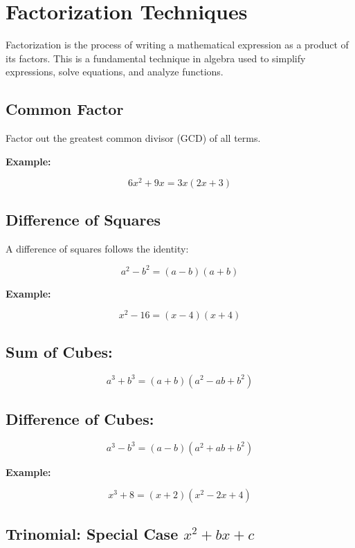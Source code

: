 \newpage
\section{Factorization Techniques}

Factorization is the process of writing a mathematical expression as a product 
of its factors. This is a fundamental technique in algebra used to simplify expressions, 
solve equations, and analyze functions.

\subsection{Common Factor}

Factor out the greatest common divisor (GCD) of all terms.
\vspace{\baselineskip}

\textbf{Example:}

\[
  6x^2 + 9x = 3x(2x + 3)
\]

\subsection{Difference of Squares}

A difference of squares follows the identity:

\[
  a^2 - b^2 = (a - b)(a + b)
\]

\textbf{Example:}

\[
  x^2 - 16 = (x - 4)(x + 4)
\]

\subsection{Sum of Cubes:}

\[
  a^3 + b^3 = (a + b)(a^2 - ab + b^2)
\]

\subsection{Difference of Cubes:}

\[
  a^3 - b^3 = (a - b)(a^2 + ab + b^2)
\]

\textbf{Example:}

\[
  x^3 + 8 = (x + 2)(x^2 - 2x + 4)
\]


\subsection{Trinomial: Special Case \texorpdfstring{\(x^2 + bx + c\)}{x² + bx + c}}

